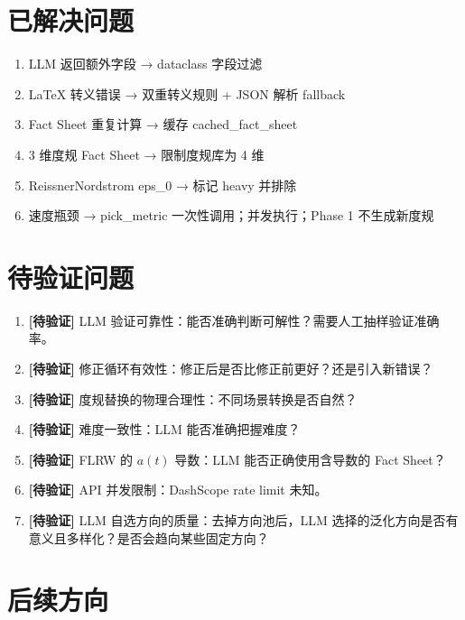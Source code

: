 \documentclass[12pt,a4paper]{article}
\newcommand{\uncertain}[1]{{\color{uncertcolor}\textbf{[待验证]}} #1}
\begin{document}
\section{已解决问题}

\begin{enumerate}
    \item LLM 返回额外字段 → dataclass 字段过滤
    \item LaTeX 转义错误 → 双重转义规则 + JSON 解析 fallback
    \item Fact Sheet 重复计算 → 缓存 cached\_fact\_sheet
    \item 3 维度规 Fact Sheet → 限制度规库为 4 维
    \item ReissnerNordstrom eps\_0 → 标记 heavy 并排除
    \item 速度瓶颈 → pick\_metric 一次性调用；并发执行；Phase 1 不生成新度规
\end{enumerate}

\section{待验证问题}

\begin{enumerate}
    \item \uncertain{LLM 验证可靠性：能否准确判断可解性？需要人工抽样验证准确率。}
    \item \uncertain{修正循环有效性：修正后是否比修正前更好？还是引入新错误？}
    \item \uncertain{度规替换的物理合理性：不同场景转换是否自然？}
    \item \uncertain{难度一致性：LLM 能否准确把握难度？}
    \item \uncertain{FLRW 的 $a(t)$ 导数：LLM 能否正确使用含导数的 Fact Sheet？}
    \item \uncertain{API 并发限制：DashScope rate limit 未知。}
    \item \uncertain{LLM 自选方向的质量：去掉方向池后，LLM 选择的泛化方向是否有意义且多样化？是否会趋向某些固定方向？}
\end{enumerate}

\section{后续方向}
\end{document}
